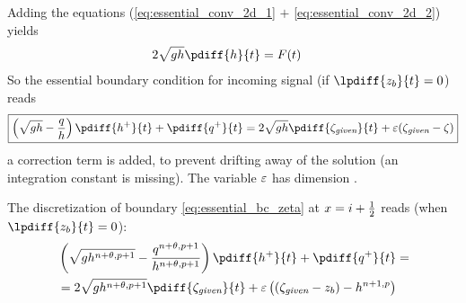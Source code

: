 Adding the equations (\eqref{eq:essential_conv_2d_1} $+$ \eqref{eq:essential_conv_2d_2}) yields
\begin{align}
    2 \sqrt{gh} \pdiff{h}{t} & = F(t)
\end{align}
%
So the essential boundary condition for incoming signal (if $\lpdiff{z_b}{t} = 0$) reads
\begin{align}
    {\boxed{
            \left(\sqrt{gh} - \frac{q}{h}\right) \pdiff{h^{+}}{t} + \pdiff{q^{+}}{t}  = 2 \sqrt{gh} \pdiff{\zeta_{\textit{given}}}{t}  + \eps(\zeta_{\textit{given}} - \zeta)
    }}\label{eq:essential_bc_2d_zeta}
\end{align}
a correction term is added, to prevent drifting away of the solution (an integration constant is missing).
The variable $\varepsilon$ has dimension \bunit{\metre\per\square\second}.

The discretization of  boundary \autoref{eq:essential_bc_zeta} at $x=i+\frac{1}{2}$ reads (when $\lpdiff{z_b}{t}=0$):
\begin{align}
    &\left(\sqrt{gh^{n+\theta,p+1}} - \frac{q^{n+\theta,p+1}}{h^{n+\theta,p+1}}\right) \pdiff{h^{+}}{t} + \pdiff{q^{+}}{t}  =
    \nonumber \\*
    & = 2 \sqrt{gh^{n+\theta,p+1}} \pdiff{\zeta_{\textit{given}}}{t}
    + \eps \left( (\zeta_{\textit{given}} -z_b) - h^{n+1,p}   \right)
\end{align}
